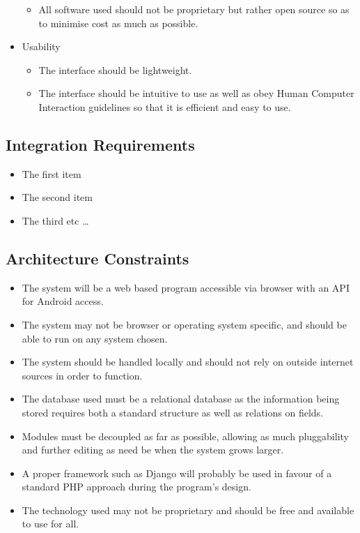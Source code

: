 \documentclass{article}
\begin{document}
\begin{itemize}
\begin{itemize}
					\item All software used should not be proprietary but rather open source so as to minimise cost as much as possible.
				\end{itemize}
				\item Usability
				\begin{itemize}
					\item The interface should be lightweight.
					\item The interface should be intuitive to use as well as obey Human Computer Interaction guidelines so that it is efficient and easy to use.
				\end{itemize}
			\end{itemize}
		
		\subsection{Integration Requirements}\label{subsec:integration}
			\begin{itemize}
			  	\item The first item
			  	\item The second item
			  	\item The third etc \ldots
			\end{itemize}
		
		\subsection{Architecture Constraints}\label{subsec:constraints}
			\begin{itemize}
				\item The system will be a web based program accessible via browser with an API for Android access.
			  	\item The system may not be browser or operating system specific, and should be able to run on any system chosen.
			  	\item The system should be handled locally and should not rely on outside internet sources in order to function.
		  		\item The database used must be a relational database as the information being stored requires both a standard structure as well as relations on fields.
		  		\item Modules must be decoupled as far as possible, allowing as much pluggability and further editing as need be when the system grows larger.
	  			\item A proper framework such as Django will probably be used in favour of a standard PHP approach during the program's design.
	  			\item The technology used may not be proprietary and should be free and available to use for all.
			\end{itemize}
		
\end{document}

